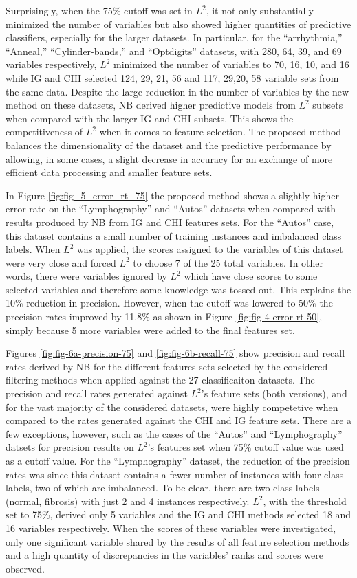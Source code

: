 \documentclass[review]{elsarticle}
\begin{document}
Surprisingly, when the 75\% cutoff was set in $ L^2 $, it not only substantially minimized the number of variables but also showed higher quantities of predictive classifiers, especially for the larger datasets. In particular, for the “arrhythmia,” “Anneal,” “Cylinder-bands,” and “Optdigits” datasets, with 280, 64, 39, and 69 variables respectively, $ L^2 $ minimized the number of variables to 70, 16, 10, and 16 while IG and CHI selected 124, 29, 21, 56 and 117, 29,20, 58  variable sets from the same data. Despite the large reduction in the number of variables by the new method on these datasets, NB derived higher predictive models from $ L^2 $ subsets when compared with the larger IG and CHI subsets. This shows the competitiveness of $ L^2 $ when it comes to feature selection. The proposed method balances the dimensionality of the dataset and the predictive performance by allowing, in some cases, a slight decrease in accuracy for an exchange of more efficient data processing and smaller feature sets. 

In Figure \ref{fig:fig_5_error_rt_75} the proposed method shows a slightly higher error rate on the “Lymphography” and “Autos” datasets when compared with results produced by NB from IG and CHI features sets. For the “Autos” case, this dataset contains a small number of training instances and imbalanced class labels. When $ L^2 $ was applied, the scores assigned to the variables of this dataset were very close and forced $ L^2 $ to choose 7 of the 25 total variables. In other words, there were variables ignored by $ L^2 $ which have close scores to some selected variables and therefore some knowledge was tossed out. This explains the 10\% reduction in precision. However, when the cutoff was lowered to 50\% the precision rates improved by 11.8\% as shown in Figure \ref{fig:fig-4-error-rt-50}, simply because 5 more variables were added to the final features set. 

Figures \ref{fig:fig-6a-precision-75} and \ref{fig:fig-6b-recall-75} show precision and recall rates derived by NB for the different features sets selected by the considered filtering methods when applied against the 27 classificaiton datasets. The precision and recall rates generated against $ L^2 $’s feature sets (both versions), and for the vast majority of the considered datasets, were highly competetive when compared to the rates generated against the CHI and IG feature sets. There are a few exceptions, however,  such as the cases of the “Autos” and “Lymphography” datsets for precision results on $ L^2 $’s features set when 75\% cutoff value was used as a cutoff value. For the “Lymphography” dataset, the reduction of the precision rates was since this dataset contains a fewer number of instances with four class labels, two of which are imbalanced. To be clear, there are two class labels (normal, fibrosis) with just 2 and 4 instances respectively. $ L^2 $, with the threshold set to 75\%, derived only 5 variables and the IG and CHI methods selected 18 and 16 variables respectively. When the scores of these variables were investigated, only one significant variable shared by the results of all feature selection methods and a high quantity of discrepancies in the variables’ ranks and scores were observed. 
\end{document}
